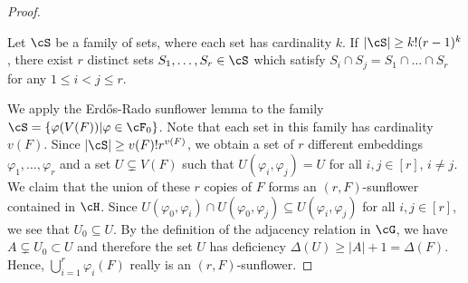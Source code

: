 \begin{proof}
\begin{theorem*} 

Let $\cS$ be a family of sets, where each set has cardinality $k$. If $|\cS|\geq k!(r-1)^k$, there exist $r$ distinct sets $S_1, \dots, S_r\in \cS$ which satisfy $S_i\cap S_j=S_1\cap \dots\cap S_r$ for any $1\leq i< j\leq r$.
\end{theorem*}

\noindent
We apply the Erd\H{o}s-Rado sunflower lemma to the family $\cS=\{\varphi(V(F))|\varphi\in \cF_0\}$. Note that each set in this family has cardinality $v(F)$. Since $|\cS|\geq v(F)!r^{v(F)}$, we obtain a set of $r$ different embeddings $\varphi_1, \dots, \varphi_r$ and a set $U\subsetneq V(F)$ such that $U(\varphi_i, \varphi_{j})=U$ for all $i, j\in [r]$, $i\neq j$. We claim that the union of these $r$ copies of $F$ forms an $(r, F)$-sunflower contained in $\cH$. Since $U(\varphi_0, \varphi_i)\cap U(\varphi_0, \varphi_{j})\subseteq U(\varphi_i, \varphi_{j})$ for all $i, j\in [r]$, we see that $U_0\subseteq U$. By the definition of the adjacency relation in $\cG$, we have $A\subsetneq U_0\subset U$ and therefore the set $U$ has deficiency $\Delta(U)\geq |A|+1=\Delta(F)$. Hence,  $\bigcup_{i=1}^r \varphi_i(F)$ really is an $(r, F)$-sunflower.


\end{proof}
